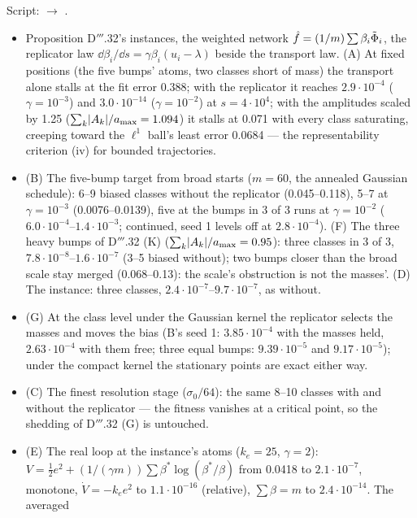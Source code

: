Script:  $\to$ .
\begin{itemize}
  \item Proposition D$'''$.32's instances, the weighted network $\hat f=(1/m)\sum\beta_i\tilde\Phi_i$, the replicator
    law $\dd\beta_i/\dd s=\gamma\beta_i(u_i-\lambda)$ beside the transport law. (A) At fixed positions (the five
    bumps' atoms, two classes short of mass) the transport alone stalls at the fit error 0.388; with the replicator it
    reaches $2.9\cdot10^{-4}$ ($\gamma=10^{-3}$) and $3.0\cdot10^{-14}$ ($\gamma=10^{-2}$) at $s=4\cdot10^4$; with the
    amplitudes scaled by 1.25 ($\sum_k\lvert A_k\rvert/a_{\max}=1.094$) it stalls at 0.071 with every class saturating,
    creeping toward the $\ell^1$ ball's least error 0.0684 --- the representability criterion (iv) for bounded
    trajectories.
  \item (B) The five-bump target from broad starts ($m=60$, the annealed Gaussian schedule): 6--9 biased classes
    without the replicator (0.045--0.118), 5--7 at $\gamma=10^{-3}$ (0.0076--0.0139), five at the bumps in 3 of 3
    runs at $\gamma=10^{-2}$ ($6.0\cdot10^{-4}$--$1.4\cdot10^{-3}$; continued, seed 1 levels off at
    $2.8\cdot10^{-4}$). (F) The three heavy bumps of D$'''$.32 (K) ($\sum_k\lvert A_k\rvert/a_{\max}=0.95$): three classes in
    3 of 3, $7.8\cdot10^{-8}$--$1.6\cdot10^{-7}$ (3--5 biased without); two bumps closer than the broad scale stay
    merged (0.068--0.13): the scale's obstruction is not the masses'. (D) The instance: three classes,
    $2.4\cdot10^{-7}$--$9.7\cdot10^{-7}$, as without.
  \item (G) At the class level under the Gaussian kernel the replicator selects the masses and moves the bias (B's
    seed 1: $3.85\cdot10^{-4}$ with the masses held, $2.63\cdot10^{-4}$ with them free; three equal bumps:
    $9.39\cdot10^{-5}$ and $9.17\cdot10^{-5}$); under the compact kernel the stationary points are exact either way.
  \item (C) The finest resolution stage ($\sigma_0/64$): the same 8--10 classes with and without the replicator ---
    the fitness vanishes at a critical point, so the shedding of D$'''$.32 (G) is untouched.
  \item \begin{sloppypar}(E) The real loop at the instance's atoms ($k_e=25$, $\gamma=2$):
    $V=\frac12e^2+(1/(\gamma m))\sum\beta^*\log(\beta^*/\beta)$ from 0.0418 to $2.1\cdot10^{-7}$, monotone,
    $\dot V=-k_ee^2$ to $1.1\cdot10^{-16}$ (relative), $\sum\beta=m$ to $2.4\cdot10^{-14}$. The averaged

\end{sloppypar}
\end{itemize}
